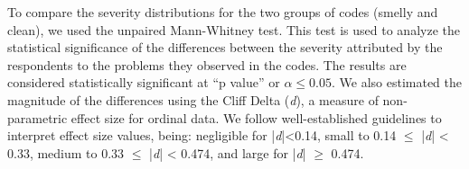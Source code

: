 To compare the severity distributions for the two groups of codes (smelly and clean), we used the unpaired Mann-Whitney\cite{Conover:99} test. This test is used to analyze the statistical significance of the differences between the severity attributed by the respondents to the problems they observed in the codes. The results are considered statistically significant at ``p value'' or $\alpha \leq  0.05$. We also estimated the magnitude of the differences using the Cliff Delta (\textit{d}), a measure of non-parametric effect size \cite{EffectSize:05} for ordinal data. We follow well-established guidelines \cite {EffectSize:05} to interpret effect size values, being: negligible for |\textit{d}|<0.14, small to 0.14 $\leq$ |\textit{d}| < 0.33, medium to 0.33 $\leq$ |\textit{d}| < 0.474, and large for |\textit{d}| $\geq$ 0.474. 

